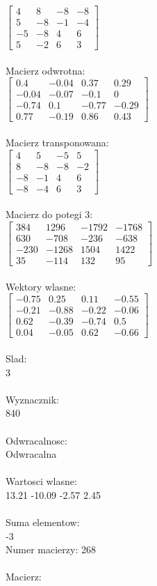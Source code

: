 \documentclass[a4paper,12pt]{article}
\begin{document}
$\begin{bmatrix} 4&8&-8&-8\\5&-8&-1&-4\\-5&-8&4&6\\5&-2&6&3 \end{bmatrix}$
\\
\\
Macierz odwrotna:\\

$\begin{bmatrix} 0.4&-0.04&0.37&0.29\\-0.04&-0.07&-0.1&0\\-0.74&0.1&-0.77&-0.29\\0.77&-0.19&0.86&0.43 \end{bmatrix}$
\\
\\
Macierz transponowana:\\

$\begin{bmatrix} 4&5&-5&5\\8&-8&-8&-2\\-8&-1&4&6\\-8&-4&6&3 \end{bmatrix}$
\\
\\
Macierz do potegi 3:\\

$\begin{bmatrix} 384&1296&-1792&-1768\\630&-708&-236&-638\\-230&-1268&1504&1422\\35&-114&132&95 \end{bmatrix}$
\\
\\
Wektory wlasne:\\

$\begin{bmatrix} -0.75&0.25&0.11&-0.55\\-0.21&-0.88&-0.22&-0.06\\0.62&-0.39&-0.74&0.5\\0.04&-0.05&0.62&-0.66 \end{bmatrix}$
\\
\\
Slad:\\
3
\\
\\
Wyznacznik:\\
840
\\
\\
Odwracalnosc:\\
Odwracalna
\\
\\
Wartosci wlasne:\\
13.21 -10.09 -2.57 2.45
\\
\\
Suma elementow:\\
-3
\\
\newpage
Numer macierzy:
268
\\
\\
Macierz:\\
\end{document}
